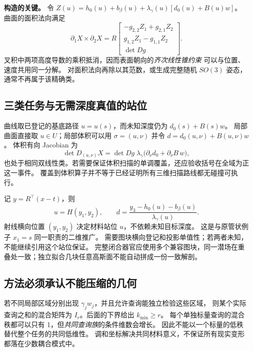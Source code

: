 \documentclass[11pt,a4paper]{article}
\numberwithin{equation}{section}
\theoremstyle{definition}
\begin{document}
\textbf{构造的关键。}
令 \(Z(u)=h_0(u)+b_\beta(u)+\lambda_\gamma(u)[d_0(u)+B(u)w]\)。
曲面的面积法向满足
\begin{equation}
 \partial_1X\times\partial_2X
 =R\begin{bmatrix}
 -g_{2,2}Z_1+g_{2,1}Z_2\\
 g_{1,2}Z_1-g_{1,1}Z_2\\
 \det Dg
 \end{bmatrix} .
 \label{eq:normal}
\end{equation}
叉积中两项高度导数的乘积抵消，因而表面朝向的\emph{齐次线性锥约束}
可以与位置、速度共用同一分解。
对面积法向再除以其范数，或生成完整随机 \(SO(3)\) 姿态，通常不再属于该精确类。

\subsection{三类任务与无需深度真值的站位}
曲线取已登记的基底路径 \(u=u(s)\)，而未知深度仍为 \(d_0(s)+B(s)w\)。
局部曲面直接取 \(u\in U\)；局部体积可以用 \(\sigma=(u,\nu)\) 并令
\(d=d_0(u,\nu)+B(u,\nu)w\)。
体积有向 Jacobian 为
\begin{equation}
 \det D_{(u,\nu)}X=\det Dg\;\lambda_\gamma
 \bigl(\partial_\nu d_0+\partial_\nu B\,w\bigr),
\end{equation}
也处于相同双线性类。若需要保证体积扫描的单调覆盖，还应验收括号在全域为正这一事件。
覆盖到体积算子并不等于已经证明所有三维扫描路线都无碰撞可执行。

记 \(y=R^\top(x-t)\)，则
\begin{equation}
 u=H(y_1,y_2),\qquad
 d=\frac{y_3-h_0(u)-b_\beta(u)}{\lambda_\gamma(u)} .
 \label{eq:inverse}
\end{equation}
射线横向位置 \((y_1,y_2)\) 决定材料站位 \(u\)，不依赖未知目标深度。
这是与原管状例子 \(x_1=s\) 同一职责的二维推广。
需要图块横向登记和投影单值性；若两者未知，不能继续引用这个站位保证。
完整闭合器官应使用多个兼容图块，同一潜场在重叠处一致；独立拟合几块任意高斯面不能自动拼成一份一致解剖。

\subsection{方法必须承认不能压缩的几何}
若不同局部区域分别出现 \(\gamma_jw_j\)，并且允许查询能独立检验这些区域，
则某个实际查询之和的混合矩阵为 \(I_r\)。后面的下界给出 \(k_{\min}\ge r\)。
每个单独标量查询的混合秩都可以只有 1，但\emph{共同查询族}的条件维数会增长。
因此不能以一个标量的低秩替代整个任务的共同低维性。
调和坐标解决共同材料意义，不保证所有现实变形都落在少数耦合模式中。
\end{document}
